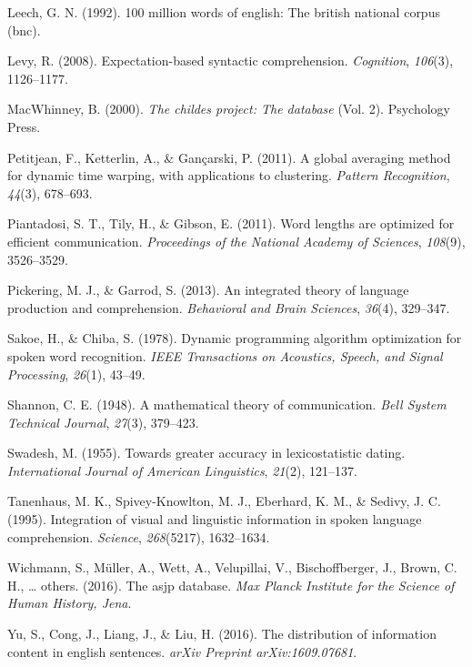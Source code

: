 \documentclass[10pt, letterpaper]{article}
\begin{document}
\leavevmode\hypertarget{ref-leech1992}{}%
Leech, G. N. (1992). 100 million words of english: The british national
corpus (bnc).

\leavevmode\hypertarget{ref-levy2008}{}%
Levy, R. (2008). Expectation-based syntactic comprehension.
\emph{Cognition}, \emph{106}(3), 1126--1177.

\leavevmode\hypertarget{ref-macwhinney2000}{}%
MacWhinney, B. (2000). \emph{The childes project: The database} (Vol.
2). Psychology Press.

\leavevmode\hypertarget{ref-petitjean2011}{}%
Petitjean, F., Ketterlin, A., \& Gançarski, P. (2011). A global
averaging method for dynamic time warping, with applications to
clustering. \emph{Pattern Recognition}, \emph{44}(3), 678--693.

\leavevmode\hypertarget{ref-piantadosi2011}{}%
Piantadosi, S. T., Tily, H., \& Gibson, E. (2011). Word lengths are
optimized for efficient communication. \emph{Proceedings of the National
Academy of Sciences}, \emph{108}(9), 3526--3529.

\leavevmode\hypertarget{ref-pickering2013}{}%
Pickering, M. J., \& Garrod, S. (2013). An integrated theory of language
production and comprehension. \emph{Behavioral and Brain Sciences},
\emph{36}(4), 329--347.

\leavevmode\hypertarget{ref-sakoe1978}{}%
Sakoe, H., \& Chiba, S. (1978). Dynamic programming algorithm
optimization for spoken word recognition. \emph{IEEE Transactions on
Acoustics, Speech, and Signal Processing}, \emph{26}(1), 43--49.

\leavevmode\hypertarget{ref-shannon1948}{}%
Shannon, C. E. (1948). A mathematical theory of communication.
\emph{Bell System Technical Journal}, \emph{27}(3), 379--423.

\leavevmode\hypertarget{ref-swadesh1955}{}%
Swadesh, M. (1955). Towards greater accuracy in lexicostatistic dating.
\emph{International Journal of American Linguistics}, \emph{21}(2),
121--137.

\leavevmode\hypertarget{ref-tanenhaus1995}{}%
Tanenhaus, M. K., Spivey-Knowlton, M. J., Eberhard, K. M., \& Sedivy, J.
C. (1995). Integration of visual and linguistic information in spoken
language comprehension. \emph{Science}, \emph{268}(5217), 1632--1634.

\leavevmode\hypertarget{ref-wichmann2016}{}%
Wichmann, S., Müller, A., Wett, A., Velupillai, V., Bischoffberger, J.,
Brown, C. H., \ldots{} others. (2016). The asjp database. \emph{Max
Planck Institute for the Science of Human History, Jena}.

\leavevmode\hypertarget{ref-yu2016}{}%
Yu, S., Cong, J., Liang, J., \& Liu, H. (2016). The distribution of
information content in english sentences. \emph{arXiv Preprint
arXiv:1609.07681}.


\end{document}
